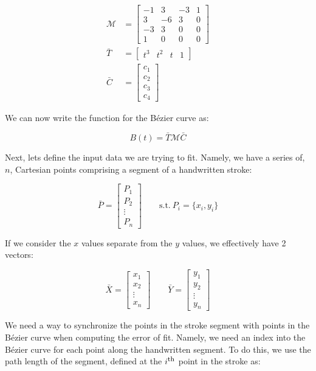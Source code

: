 \documentclass{article}
\newcommand{\Ith}{\ensuremath{i^\textrm{\footnotesize th}}}
\begin{document}
\begin{align*}
  \mathcal{M} &= \left[
    \begin{array}{rrrr}
      -1 &  3 & -3 & 1 \\
       3 & -6 &  3 & 0 \\
      -3 &  3 &  0 & 0 \\
       1 &  0 &  0 & 0
    \end{array}
  \right] \\
  \bar{T} &= \left[\begin{array}{cccc}t^3 & t^2 & t & 1\end{array}\right] \\
  \bar{C} &= \left[\begin{array}{r}c_1\\c_2\\c_3\\c_4\end{array}\right]
\end{align*}

We can now write the function for the B\'ezier curve as:

\[B(t)=\bar{T}\mathcal{M}\bar{C}\]

Next, lets define the input data we are trying to fit. Namely, we have a series of, $n$, Cartesian points comprising a segment of a handwritten stroke:

\[\bar{P}=\left[\begin{array}{c}P_1\\P_2\\\vdots\\P_n\end{array}\right] \qquad \textrm{s.t.}\ P_i=\{x_i,y_i\}\]

If we consider the $x$ values separate from the $y$ values, we effectively have 2 vectors:

\[\bar{X}=\left[\begin{array}{c}x_1\\x_2\\\vdots\\x_n\end{array}\right] \qquad \bar{Y}=\left[\begin{array}{c}y_1\\y_2\\\vdots\\y_n\end{array}\right]\]

We need a way to synchronize the points in the stroke segment with points in the B\'ezier curve when computing the error of fit. Namely, we need an index into the B\'ezier curve for each point along the handwritten segment. To do this, we use the path length of the segment, defined at the $\Ith$ point in the stroke as:
\end{document}
